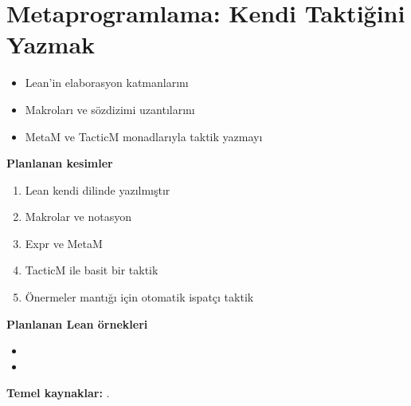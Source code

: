\chapter{Metaprogramlama: Kendi Taktiğini Yazmak}\label{bol:metaprog}

\begin{bolumhedefleri}
\begin{itemize}
  \item Lean'in elaborasyon katmanlarını
  \item Makroları ve sözdizimi uzantılarını
  \item MetaM ve TacticM monadlarıyla taktik yazmayı
\end{itemize}
\end{bolumhedefleri}

\begin{taslakplan}
\textbf{Planlanan kesimler}
\begin{enumerate}[label=\thechapter.\arabic*, leftmargin=2.4em]
  \item Lean kendi dilinde yazılmıştır
  \item Makrolar ve notasyon
  \item Expr ve MetaM
  \item TacticM ile basit bir taktik
  \item Önermeler mantığı için otomatik ispatçı taktik
\end{enumerate}

\textbf{Planlanan Lean örnekleri}
\begin{itemize}
  \item {}
  \item {}
\end{itemize}

\textbf{Temel kaynaklar:} \citet{metaprogramming,ullrich2022macros,demoura2021lean4}.
\end{taslakplan}

